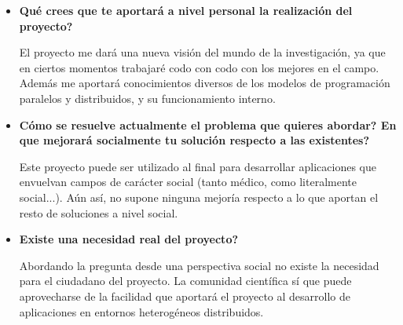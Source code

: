 \begin{itemize}
 \item \textbf{Qué crees que te aportará a nivel personal la realización del proyecto?}\newline
 
 El proyecto me dará una nueva visión del mundo de la investigación, ya que en ciertos momentos trabajaré codo con codo con los mejores en el campo. Además me aportará conocimientos diversos de los modelos de programación paralelos y distribuidos, y su funcionamiento interno.
 \item \textbf{Cómo se resuelve actualmente el problema que quieres abordar? En que mejorará socialmente tu solución respecto a las existentes?}\newline
 
 Este proyecto puede ser utilizado al final para desarrollar aplicaciones que envuelvan campos de carácter social (tanto médico, como literalmente social...). Aún así, no supone ninguna mejoría respecto a lo que aportan el resto de soluciones a nivel social.
 
 \item \textbf{Existe una necesidad real del proyecto?}\newline
 
 Abordando la pregunta desde una perspectiva social no existe la necesidad para el ciudadano del proyecto. La comunidad científica sí que puede aprovecharse de la facilidad que aportará el proyecto al desarrollo de aplicaciones en entornos heterogéneos distribuidos.
 
\end{itemize}

















